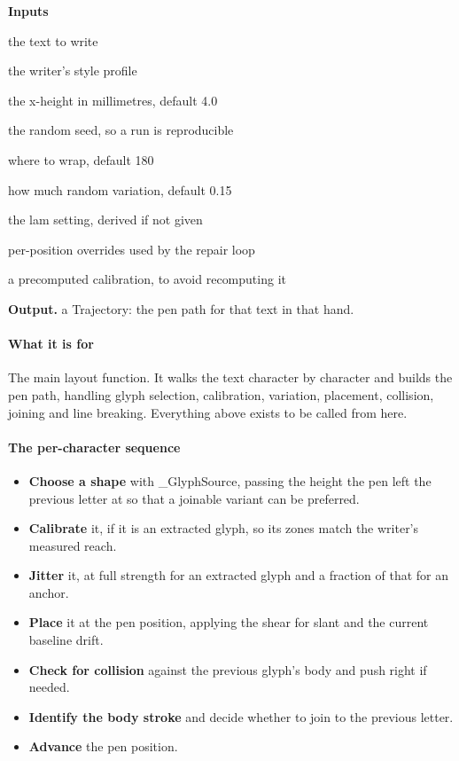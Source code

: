 \noindent\textbf{Inputs}
\begin{description}[leftmargin=2.2em,style=nextline,font=\normalfont\ttfamily]\setlength\itemsep{1pt}
  \item[{text}] \normalfont the text to write
  \item[{profile}] \normalfont the writer's style profile
  \item[{mmPerXh}] \normalfont the x-height in millimetres, default 4.0
  \item[{seed}] \normalfont the random seed, so a run is reproducible
  \item[{lineWidthMm}] \normalfont where to wrap, default 180
  \item[{jitter}] \normalfont how much random variation, default 0.15
  \item[{legibility}] \normalfont the lam setting, derived if not given
  \item[{perCharLam}] \normalfont per-position overrides used by the repair loop
  \item[{\_cal}] \normalfont a precomputed calibration, to avoid recomputing it
\end{description}

\noindent\textbf{Output.} a Trajectory: the pen path for that text in that hand.


\paragraph{What it is for}
The main layout function. It walks the text character by character and builds the pen path, handling glyph selection, calibration, variation, placement, collision, joining and line breaking. Everything above exists to be called from here.


\paragraph{The per-character sequence}

\begin{itemize}\setlength\itemsep{0pt}
  \item \textbf{Choose a shape} with \_GlyphSource, passing the height the pen left the previous letter at so that a joinable variant can be preferred.
  \item \textbf{Calibrate} it, if it is an extracted glyph, so its zones match the writer's measured reach.
  \item \textbf{Jitter} it, at full strength for an extracted glyph and a fraction of that for an anchor.
  \item \textbf{Place} it at the pen position, applying the shear for slant and the current baseline drift.
  \item \textbf{Check for collision} against the previous glyph's body and push right if needed.
  \item \textbf{Identify the body stroke} and decide whether to join to the previous letter.
  \item \textbf{Advance} the pen position.
\end{itemize}

